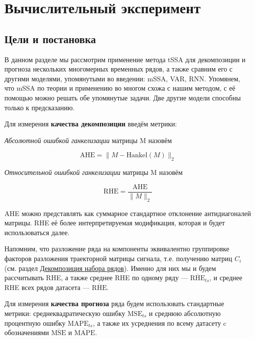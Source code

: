 	\section{Вычислительный эксперимент}	
	
	\subsection*{Цели и постановка}
	
	В данном разделе мы рассмотрим применение метода tSSA для декомпозиции и прогноза нескольких многомерных временных рядов, а также сравним его с другими моделями, упомянутыми во введении: mSSA, VAR, RNN. Упомянем, что mSSA по теории и применению во многом схожа с нашим методом, с её помощью можно решать обе упомянутые задачи. Две другие модели способны только к предсказанию.
	
	Для измерения \textbf{качества декомпозиции} введём метрики:
	
	\begin{Def}
		\emph{Абсолютной ошибкой ганкелизации} матрицы M назовём 
		
		\[
		\text{AHE} = \lVert M - \text{Hankel}(M) \rVert_2
		\] 
		
	\end{Def}	
	
	\begin{Def}		
		
		\emph{Относительной ошибкой ганкелизации} матрицы M назовём 
		
		\[
		\text{RHE} = \frac{\text{AHE}}{\lVert M \rVert_2} 
		\] 		
		
	\end{Def}
	
	AHE можно представлять как суммарное стандартное отклонение антидиагоналей матрицы. RHE её более интерпретируемая модификация, которая и будет использоваться далее. 
	
	Напомним, что разложение ряда на компоненты эквивалентно группировке факторов разложения траекторной матрицы сигнала, т.е. получению матриц $ C_i $ (см. раздел \hyperref[sec:decomposition]{Декомпозиция набора рядов}). Именно для них мы и будем рассчитывать RHE, а также среднее RHE по одному ряду --- $ \overline{\text{RHE}}_{ts} $, и среднее RHE всех рядов датасета --- $ \overline{\text{RHE}} $.
	
	Для измерения \textbf{качества прогноза} ряда будем использовать стандартные метрики: среднеквадратическую ошибку $ \text{MSE}_{ts} $ и среднюю абсолютную процентную ошибку $ \text{MAPE}_{ts} $, а также их усреднения по всему датасету c обозначениями $ \overline{\text{MSE}} $ и $ \overline{\text{MAPE}} $.
	
